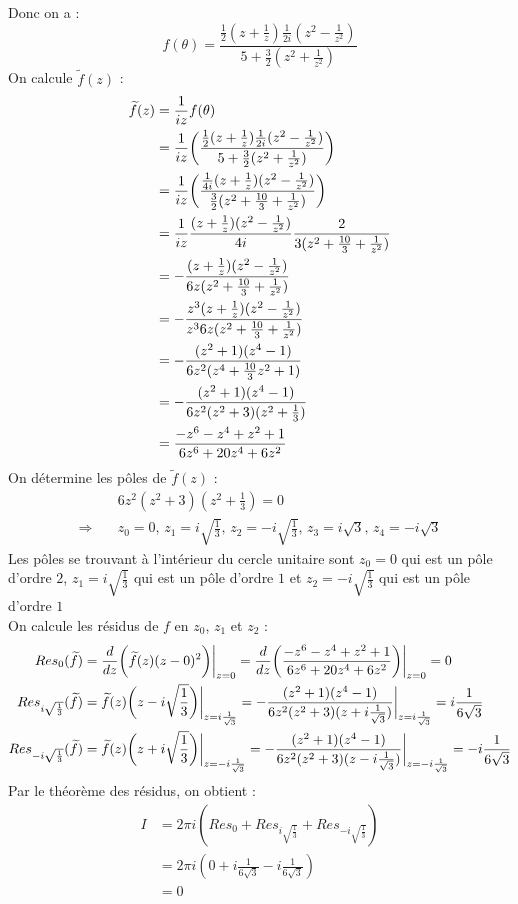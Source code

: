 Donc on a :
$$f(\theta) = \frac{\frac{1}{2}(z + \frac{1}{z}) \frac{1}{2i}(z^2 - \frac{1}{z^2})}{5 + \frac{3}{2} (z^2 + \frac{1}{z^2})}$$
On calcule $\widetilde{f}(z)$ :
\begin{align*}
    \widetilde{f}(z) &= \frac{1}{iz} f(\theta) \\
    &= \frac{1}{iz} \bigg{(} \frac{\frac{1}{2}(z + \frac{1}{z}) \frac{1}{2i}(z^2 - \frac{1}{z^2})}{5 + \frac{3}{2} (z^2 + \frac{1}{z^2})} \bigg{)} \\
    &= \frac{1}{iz} \bigg{(} \frac{\frac{1}{4i}(z + \frac{1}{z})(z^2 - \frac{1}{z^2})}{\frac{3}{2} (z^2 + \frac{10}{3} + \frac{1}{z^2})} \bigg{)} \\
    &= \frac{1}{iz} \frac{(z + \frac{1}{z})(z^2 - \frac{1}{z^2})}{4i} \frac{2}{3(z^2 + \frac{10}{3} + \frac{1}{z^2})} \\
    &= -\frac{(z + \frac{1}{z})(z^2 - \frac{1}{z^2})}{6z(z^2 + \frac{10}{3} + \frac{1}{z^2})} \\
    &= -\frac{z^3(z + \frac{1}{z})(z^2 - \frac{1}{z^2})}{z^36z(z^2 + \frac{10}{3} + \frac{1}{z^2})} \\
    &= -\frac{(z^2 + 1)(z^4 - 1)}{6z^2(z^4 + \frac{10}{3}z^2 + 1)} \\
    &= -\frac{(z^2 + 1)(z^4 - 1)}{6z^2(z^2+3)(z^2+\frac{1}{3})} \\
    &= \frac{-z^6-z^4+z^2+1}{6z^6+20z^4+6z^2}
\end{align*}
On détermine les pôles de $\widetilde{f}(z)$ :
\begin{align*}
    &6z^2(z^2+3)(z^2+\frac{1}{3}) = 0 \\
    \Rightarrow \quad &z_0 = 0 \text{, } z_1 = i\sqrt{\frac{1}{3}} \text{, } z_2 = -i\sqrt{\frac{1}{3}} \text{, } z_3 = i\sqrt{3} \text{, } z_4 = -i\sqrt{3}
\end{align*}
Les pôles se trouvant à l'intérieur du cercle unitaire sont $z_0 = 0$ qui est un pôle d'ordre $2$, $z_1 = i\sqrt{\frac{1}{3}}$ qui est un pôle d'ordre $1$ et $z_2 = -i\sqrt{\frac{1}{3}}$ qui est un pôle d'ordre $1$ \\
On calcule les résidus de $f$ en $z_0$, $z_1$ et $z_2$ :
\begin{align*}
    Res_0(\widetilde{f}) &= \frac{d}{dz} \bigg{(} \widetilde{f}(z)(z-0)^2 \bigg{)} \bigg{|}_{z=0} = \frac{d}{dz} \bigg{(} \frac{-z^6-z^4+z^2+1}{6z^6+20z^4+6z^2} \bigg{)} \bigg{|}_{z=0} = 0 \\
    Res_{i\sqrt{\frac{1}{3}}}(\widetilde{f}) &= \widetilde{f}(z)\bigg{(}z-i\sqrt{\frac{1}{3}}\bigg{)} \bigg{|}_{z=i\frac{1}{\sqrt{3}}} = -\frac{(z^2 + 1)(z^4 - 1)}{6z^2(z^2+3)(z+i\frac{1}{\sqrt{3}})} \bigg{|}_{z=i\frac{1}{\sqrt{3}}} = i\frac{1}{6\sqrt{3}} \\
    Res_{-i\sqrt{\frac{1}{3}}}(\widetilde{f}) &= \widetilde{f}(z)\bigg{(}z+i\sqrt{\frac{1}{3}}\bigg{)} \bigg{|}_{z=-i\frac{1}{\sqrt{3}}} = -\frac{(z^2 + 1)(z^4 - 1)}{6z^2(z^2+3)(z-i\frac{1}{\sqrt{3}})} \bigg{|}_{z=-i\frac{1}{\sqrt{3}}} = -i\frac{1}{6\sqrt{3}}
\end{align*}
Par le théorème des résidus, on obtient :
\begin{align*}
    I &= 2\pi i (Res_0 + Res_{i\sqrt{\frac{1}{3}}} + Res_{-i\sqrt{\frac{1}{3}}}) \\
    &= 2 \pi i (0 + i\frac{1}{6\sqrt{3}} -i\frac{1}{6\sqrt{3}}) \\
    &= 0
\end{align*}
